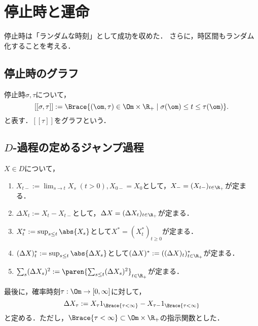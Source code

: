 \documentclass[uplatex,dvipdfmx]{jsreport}
\begin{document}
\section{停止時と運命}

\begin{tcolorbox}[colframe=ForestGreen, colback=ForestGreen!10!white,breakable,colbacktitle=ForestGreen!40!white,coltitle=black,fonttitle=\bfseries\sffamily,
title=]
    停止時は「ランダムな時刻」として成功を収めた．
    さらに，時区間もランダム化することを考える．
\end{tcolorbox}

\subsection{停止時のグラフ}

\begin{example}[停止時のグラフ]
    停止時$\sigma,\tau$について，
    \[[[\sigma,\tau]]:=\Brace{(\om,\tau)\in\Om\times\R_+\mid\sigma(\om)\le t\le\tau(\om)}.\]
    と表す．$[[\tau]]$をグラフという．
\end{example}

\subsection{$D$-過程の定めるジャンプ過程}

\begin{example}[$D$-過程の局所化]
    $X\in D$について，
    \begin{enumerate}
        \item $X_{t-}:=\lim_{s\to t}X_s\;(t>0),X_{0-}=X_0$として，$X_-=(X_{t-})_{t\in\R_+}$が定まる．
        \item $\Delta X_t:=X_t-X_{t-}$として，$\Delta X=(\Delta X_t)_{t\in\R_+}$が定まる．
        \item $X^*_t:=\sup_{s\le t}\abs{X_s}$として$X^*=(X^*_t)_{t\ge0}$が定まる．
        \item $(\Delta X)_t^*:=\sup_{s\le t}\abs{\Delta X_s}$として$(\Delta X)^*:=((\Delta X)_t)_{t\in\R_+}^*$が定まる．
        \item $\sum_s(\Delta X_s)^2:=\paren{\sum_{s\le t}(\Delta X_s)^2}_{t\in\R_+}$が定まる．
    \end{enumerate}
    最後に，確率時刻$\tau:\Om\to[0,\infty]$に対して，
    \[\Delta X_\tau:=X_\tau 1_{\Brace{\tau<\infty}}-X_{\tau-}1_{\Brace{\tau<\infty}}\]
    と定める．ただし，$\Brace{\tau<\infty}\subset\Om\times\R_+$の指示関数とした．
\end{example}
\end{document}

